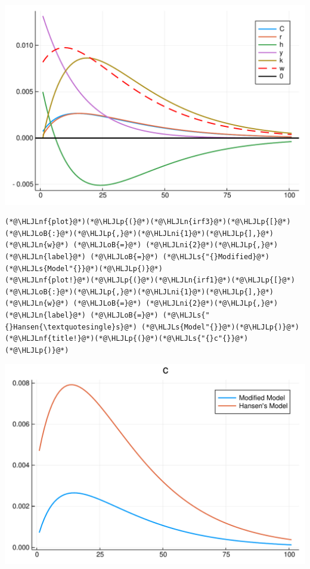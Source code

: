 \documentclass[12pt,a4paper]{article}
\newcommand{\HLJLn}[1]{#1}
\newcommand{\HLJLnf}[1]{\textcolor[RGB]{66,102,213}{#1}}
\newcommand{\HLJLs}[1]{\textcolor[RGB]{201,61,57}{#1}}
\newcommand{\HLJLni}[1]{\textcolor[RGB]{59,151,46}{#1}}
\newcommand{\HLJLoB}[1]{\textcolor[RGB]{102,102,102}{\textbf{#1}}}
\newcommand{\HLJLp}[1]{#1}
\begin{document}
\includegraphics[width=\linewidth]{figures/yvan_13_1.pdf}

\begin{lstlisting}
(*@\HLJLnf{plot}@*)(*@\HLJLp{(}@*)(*@\HLJLn{irf3}@*)(*@\HLJLp{[}@*)(*@\HLJLoB{:}@*)(*@\HLJLp{,}@*)(*@\HLJLni{1}@*)(*@\HLJLp{],}@*) (*@\HLJLn{w}@*) (*@\HLJLoB{=}@*) (*@\HLJLni{2}@*)(*@\HLJLp{,}@*) (*@\HLJLn{label}@*) (*@\HLJLoB{=}@*) (*@\HLJLs{"{}Modified}@*) (*@\HLJLs{Model"{}}@*)(*@\HLJLp{)}@*)
(*@\HLJLnf{plot!}@*)(*@\HLJLp{(}@*)(*@\HLJLn{irf1}@*)(*@\HLJLp{[}@*)(*@\HLJLoB{:}@*)(*@\HLJLp{,}@*)(*@\HLJLni{1}@*)(*@\HLJLp{],}@*) (*@\HLJLn{w}@*) (*@\HLJLoB{=}@*) (*@\HLJLni{2}@*)(*@\HLJLp{,}@*) (*@\HLJLn{label}@*) (*@\HLJLoB{=}@*) (*@\HLJLs{"{}Hansen{\textquotesingle}s}@*) (*@\HLJLs{Model"{}}@*)(*@\HLJLp{)}@*)
(*@\HLJLnf{title!}@*)(*@\HLJLp{(}@*)(*@\HLJLs{"{}c"{}}@*)(*@\HLJLp{)}@*)
\end{lstlisting}

\includegraphics[width=\linewidth]{figures/yvan_14_1.pdf}
\end{document}
